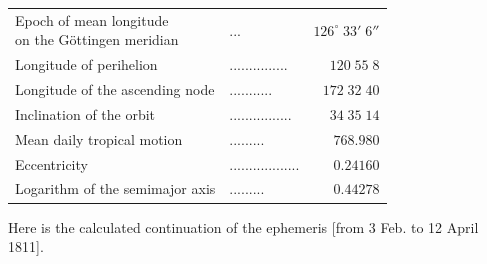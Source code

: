 \begin{center}\fontsize{10}{12}\selectfont\setlength{\tabcolsep}{4pt}\renewcommand{\arraystretch}{1.15}\begin{tabular}{llr}
\shortstack[l]{Epoch of mean longitude\\on the Göttingen meridian} & .\;.\;. & $126^\circ\;33'\;6''$\\
Longitude of perihelion & .\;.\;.\;.\;.\;.\;.\;.\;.\;.\;.\;.\;.\;.\;. & $120\;55\;8$\\
Longitude of the ascending node & .\;.\;.\;.\;.\;.\;.\;.\;.\;.\;. & $172\;32\;40$\\
Inclination of the orbit & .\;.\;.\;.\;.\;.\;.\;.\;.\;.\;.\;.\;.\;.\;.\;. & $34\;35\;14$\\
Mean daily tropical motion & .\;.\;.\;.\;.\;.\;.\;.\;. & $768.980$\\
Eccentricity & .\;.\;.\;.\;.\;.\;.\;.\;.\;.\;.\;.\;.\;.\;.\;.\;.\;. & $0.24160$\\
Logarithm of the semimajor axis & .\;.\;.\;.\;.\;.\;.\;.\;. & $0.44278$\\
\end{tabular}\end{center}

\par\indent Here is the calculated continuation of the ephemeris [from 3 Feb. to 12 April 1811].
